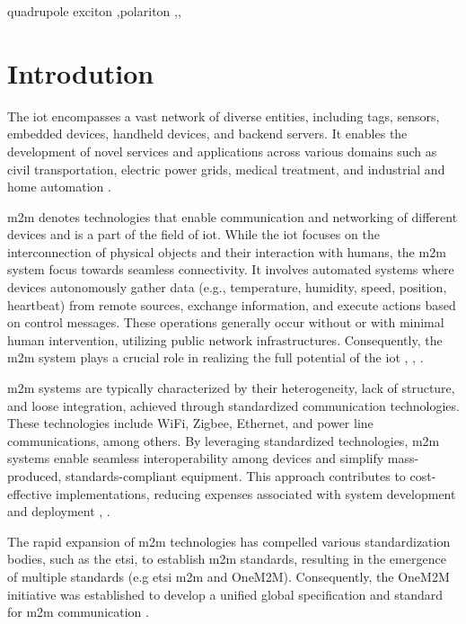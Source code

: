 \documentclass[a4paper,fleqn]{cas-dc}
\begin{document}
\begin{keywords}
quadrupole exciton \sep polariton \sep \WGM \sep \BEC
\end{keywords}


\maketitle

\section{Introdution}

The \gls{iot} encompasses a vast network of diverse entities, including tags, sensors, embedded devices, handheld devices, and backend servers. It enables the development of novel services and applications across various domains such as civil transportation, electric power grids, medical treatment, and industrial and home automation \cite{kim_m2m_2014}. 

\gls{m2m} denotes technologies that enable communication and networking of different devices and is a part of the field of \gls{iot}. While the \gls{iot} focuses on the interconnection of physical objects and their interaction with humans, the \gls{m2m} system focus towards seamless connectivity. It involves automated systems where devices autonomously gather data (e.g., temperature, humidity, speed, position, heartbeat) from remote sources, exchange information, and execute actions based on control messages. These operations generally occur without or with minimal human intervention, utilizing public network infrastructures. Consequently, the \gls{m2m} system plays a crucial role in realizing the full potential of the \gls{iot} \cite{kim_m2m_2014}, \cite{lawton_machine_2004}, \cite{pticek_architecture_2015}.

\gls{m2m} systems are typically characterized by their heterogeneity, lack of structure, and loose integration, achieved through standardized communication technologies. These technologies include WiFi, Zigbee, Ethernet, and power line communications, among others. By leveraging standardized technologies, \gls{m2m} systems enable seamless interoperability among devices and simplify mass-produced, standards-compliant equipment. This approach contributes to cost-effective implementations, reducing expenses associated with system development and deployment \cite{lawton_machine_2004}, \cite{cao_survey_2016}.

The rapid expansion of \gls{m2m} technologies has compelled various standardization bodies, such as the  \gls{etsi}, to establish \gls{m2m} standards, resulting in the emergence of multiple standards (e.g \gls{etsi} \gls{m2m} and OneM2M). Consequently, the OneM2M initiative was established to develop a unified global specification and standard for \gls{m2m} communication \cite{pticek_architecture_2015}.
\end{document}
